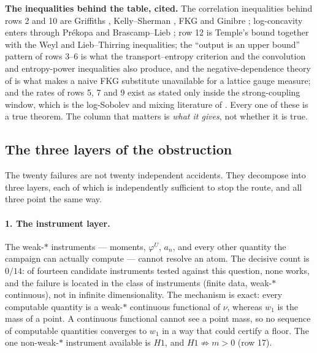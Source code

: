 \noindent\textbf{The inequalities behind the table, cited.} The correlation inequalities behind rows 2
and 10 are Griffiths \cite{griffiths}, Kelly--Sherman \cite{ksherman}, FKG \cite{fkg} and Ginibre
\cite{ginibre}; log-concavity enters through Pr\'ekopa \cite{prekopa} and Brascamp--Lieb \cite{bl};
row 12 is Temple's bound \cite{temple} together with the Weyl and Lieb--Thirring inequalities; the
``output is an upper bound'' pattern of rows 3--6 is what the transport--entropy criterion
\cite{vrs} and the convolution and entropy-power inequalities \cite{royen,gsv} also produce, and the
negative-dependence theory of \cite{bbl} is what makes a naive FKG substitute unavailable for a
lattice gauge measure; and the rates of rows 5, 7 and 9 exist as stated only inside the
strong-coupling window, which is the log-Sobolev and mixing literature of
\cite{js,sinclair,feller,bbs}. Every one of these is a true theorem. The column that matters is
\emph{what it gives}, not whether it is true.

\subsection{The three layers of the obstruction}\label{sec:survey-three}

The twenty failures are not twenty independent accidents. They decompose into three
layers, each of which is independently sufficient to stop the route, and all three point
the same way.

\paragraph{1. The instrument layer.} The weak-$*$ instruments --- moments, $\varphi^U$,
$a_n$, and every other quantity the campaign can actually compute --- cannot resolve an
atom. The decisive count is $0/14$: of fourteen candidate instruments tested against this
question, none works, and the failure is located in the class of instruments (finite data,
weak-$*$ continuous), not in infinite dimensionality. The mechanism is exact: every
computable quantity is a weak-$*$ continuous functional of $\nu$, whereas $w_1$ is the
mass of a point. A continuous functional cannot see a point mass, so no sequence of
computable quantities converges to $w_1$ in a way that could certify a floor. The one
non-weak-$*$ instrument available is $H1$, and $H1\not\Rightarrow m>0$ (row 17).

